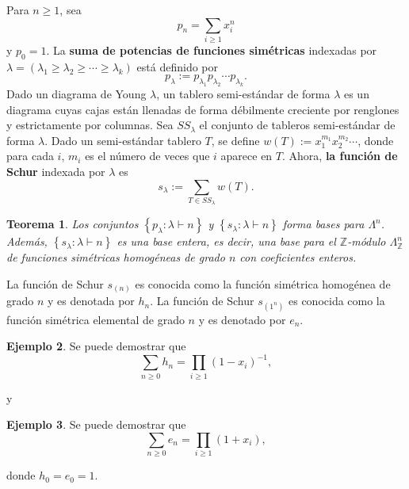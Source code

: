 \documentclass[12pt]{book}
\newtheorem{theorem}{Teorema}[section]
\theoremstyle{definition}
\newtheorem{example}[theorem]{Ejemplo}
\newcounter{in}
\newcounter{ini}
\begin{document}
Para $n \geq 1$, sea
\begin{equation}
  \label{eq:99}
  p_n = \sum_{i \geq 1} x_{i}^{n}
\end{equation}
y $p_0 = 1$.
La \textbf{suma de potencias de funciones simétricas} indexadas por
$\lambda = (\lambda_1 \geq \lambda_2 \geq \cdots \geq \lambda_k)$ está
definido por
\begin{equation}
  \label{eq:100}
  p_{\lambda} := p_{\lambda_1}p_{\lambda_2} \cdots p_{\lambda_k}.
\end{equation}
Dado un diagrama de Young $\lambda$, un tablero semi-estándar de forma
$\lambda$ es un diagrama cuyas cajas están llenadas de forma
débilmente creciente por renglones y estrictamente por columnas. Sea
$SS_{\lambda}$ el conjunto de tableros semi-estándar de forma
$\lambda$. Dado un semi-estándar tablero $T$, se define
$w(T) := x_{1}^{m_1}x_{2}^{m_2} \cdots$, donde para cada $i$, $m_i$ es
el número de veces que $i$ aparece en $T$. Ahora, \textbf{la función
de Schur} indexada por $\lambda$ es
\begin{equation}
  \label{eq:101}
  s_{\lambda} := \sum_{T \in SS_{\lambda}}w(T). 
\end{equation}
\begin{theorem}
  \label{h_s_f_b}
  Los conjuntos $\left \{ p_{\lambda} : \lambda \vdash n \right \}$ y
  $\left \{ s_{\lambda} : \lambda \vdash n \right \}$ forma bases para
  $\Lambda^{n}$. Además,
  $\left \{ s_{\lambda} : \lambda \vdash n \right \}$ es una base entera, es decir, una base para el $\mathbb{Z}$-módulo
  $\Lambda_{\mathbb{Z}}^{n}$ de funciones simétricas homogéneas de
  grado $n$ con coeficientes enteros.
\end{theorem}
La función de Schur $s_{(n)}$ es conocida como la función simétrica
homogénea de grado $n$ y es denotada por $h_n$. La función de Schur
$s_{(1^{n})}$ es conocida como la función simétrica elemental de grado
$n$ y es denotado por $e_n$. 
\begin{example}
  \label{Ej_s1}
  Se puede demostrar que
  $$\sum_{n \geq 0} h_n = \prod_{i \geq 1} (1-x_{i})^{-1},$$
\end{example}
y
\begin{example}
  \label{Ej_s1}
  Se puede demostrar que
  $$\sum_{n \geq 0} e_n = \prod_{i \geq 1} (1+x_{i}),$$
\end{example}
donde $h_0 = e_0 = 1$.
\end{document}
